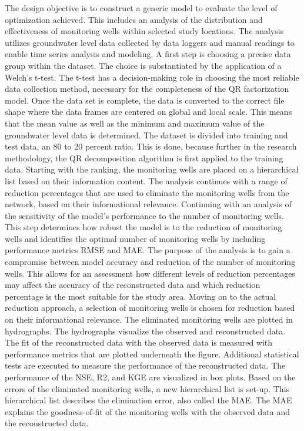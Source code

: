 The design objective is to construct a generic model to evaluate the level of optimization achieved. This includes an analysis of the distribution and effectiveness of monitoring wells within selected study locations. The analysis utilizes groundwater level data collected by data loggers and manual readings to enable time series analysis and modeling. A first step is choosing a precise data group within the dataset. The choice is substantiated by the application of a Welch's t-test. The t-test has a decision-making role in choosing the most reliable data collection method, necessary for the completeness of the QR factorization model. Once the data set is complete, the data is converted to the correct file shape where the data frames are centered on global and local scale. This means that the mean value as well as the minimum and maximum value of the groundwater level data is determined. The dataset is divided into training and test data, an 80 to 20 percent ratio. This is done, because further in the research methodology, the QR decomposition algorithm is first applied to the training data. Starting with the ranking, the monitoring wells are placed on a hierarchical list based on their information content. The analysis continues with a range of reduction percentages that are used to eliminate the monitoring wells from the network, based on their informational relevance. Continuing with an analysis of the sensitivity of the model's performance to the number of monitoring wells. This step determines how robust the model is to the reduction of monitoring wells and identifies the optimal number of monitoring wells by including performance metrics RMSE and MAE. The purpose of the analysis is to gain a compromise between model accuracy and reduction of the number of monitoring wells. This allows for an assessment how different levels of reduction percentages may affect the accuracy of the reconstructed data and which reduction percentage is the most suitable for the study area. Moving on to the actual reduction approach, a selection of monitoring wells is chosen for reduction based on their informational relevance. The eliminated monitoring wells are plotted in hydrographs. The hydrographs visualize the observed and reconstructed data. The fit of the reconstructed data with the observed data is measured with performance metrics that are plotted underneath the figure. Additional statistical tests are executed to measure the performance of the reconstructed data. The performance of the NSE, R2, and KGE are visualized in box plots. Based on the errors of the eliminated monitoring wells, a new hierarchical list is set-up. This hierarchical list describes the elimination error, also called the MAE. The MAE explains the goodness-of-fit of the monitoring wells with the observed data and the reconstructed data. 


